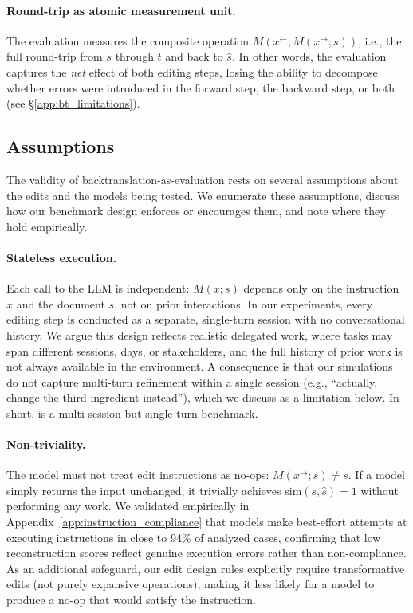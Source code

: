\documentclass{article} %
\begin{document}
\paragraph{Round-trip as atomic measurement unit.} The evaluation measures the composite operation $M(x^{\leftarrow}; M(x^{\rightarrow}; s))$, i.e., the full round-trip from $s$ through $t$ and back to $\hat{s}$. In other words, the evaluation captures the \textit{net} effect of both editing steps, losing the ability to decompose whether errors were introduced in the forward step, the backward step, or both (see \S\ref{app:bt_limitations}).

\subsection{Assumptions} \label{app:bt_assumptions}

The validity of backtranslation-as-evaluation rests on several assumptions about the edits and the models being tested. We enumerate these assumptions, discuss how our benchmark design enforces or encourages them, and note where they hold empirically.

\paragraph{Stateless execution.} Each call to the LLM is independent: $M(x; s)$ depends only on the instruction $x$ and the document $s$, not on prior interactions. In our experiments, every editing step is conducted as a separate, single-turn session with no conversational history. We argue this design reflects realistic delegated work, where tasks may span different sessions, days, or stakeholders, and the full history of prior work is not always available in the environment. A consequence is that our simulations do not capture multi-turn refinement within a single session (e.g., ``actually, change the third ingredient instead''), which we discuss as a limitation below. In short, \benchmark{} is a multi-session but single-turn benchmark.

\paragraph{Non-triviality.} The model must not treat edit instructions as no-ops: $M(x^{\rightarrow}; s) \neq s$. If a model simply returns the input unchanged, it trivially achieves $\mathrm{sim}(s, \hat{s}) = 1$ without performing any work. We validated empirically in Appendix~\ref{app:instruction_compliance} that models make best-effort attempts at executing instructions in close to 94\% of analyzed cases, confirming that low reconstruction scores reflect genuine execution errors rather than non-compliance. As an additional safeguard, our edit design rules explicitly require transformative edits (not purely expansive operations), making it less likely for a model to produce a no-op that would satisfy the instruction.
\end{document}
